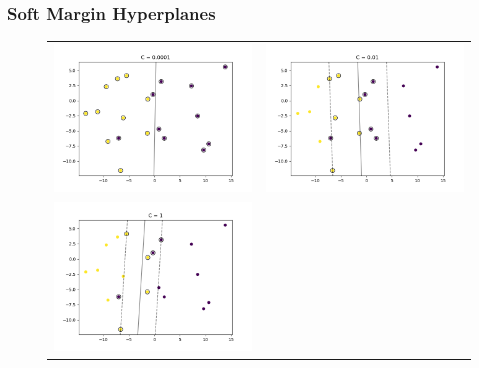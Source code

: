 \documentclass{beamer}
\begin{document}
\begin{frame}{}
	\frametitle{Soft Margin Hyperplanes}
	\begin{figure}
        \begin{tabular}{ll}
    		\includegraphics[scale=0.25]{img/SlackSVM01.png}
    		&
    		\includegraphics[scale=0.25]{img/SlackSVM02.png} \\
            \includegraphics[scale=0.25]{img/SlackSVM03.png}

\end{tabular}
\end{figure}
\end{frame}
\end{document}

